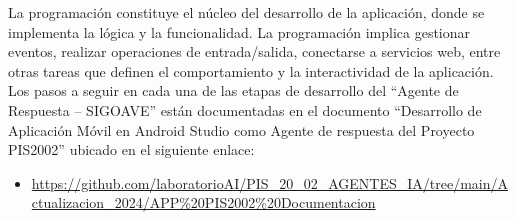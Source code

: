 \documentclass[a4paper,10pt, oneside, titlepage]{article}
\begin{document}
	\indent \indent La programación constituye el núcleo del desarrollo de la aplicación, donde se implementa la lógica y la funcionalidad. La programación implica gestionar eventos, realizar operaciones de entrada/salida, conectarse a servicios web, entre otras tareas que definen el comportamiento y la interactividad de la aplicación. \\\newline
	\indent Los pasos a seguir en cada una de las etapas de desarrollo del ``Agente de Respuesta – SIGOAVE'' están documentadas en el documento ``Desarrollo de Aplicación Móvil en Android Studio como Agente de respuesta del Proyecto PIS2002'' ubicado en el siguiente enlace:
	\begin{itemize}
		\item \textcolor{blue}{\url{https://github.com/laboratorioAI/PIS_20_02_AGENTES_IA/tree/main/Actualizacion_2024/APP\%20PIS2002\%20Documentacion}}
	\end{itemize}
\end{document}
